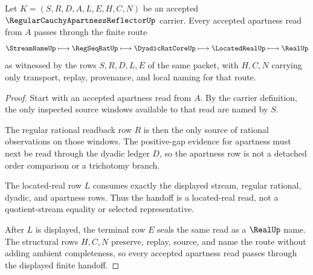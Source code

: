 \begin{theorem}
\label{thm:regular-cauchy-apartness-reflector-located-real-handoff}
Let $K=(S,R,D,A,L,E,H,C,N)$ be an accepted $\RegularCauchyApartnessReflectorUp$ carrier. Every accepted apartness read from $A$ passes through the finite route
$$
\StreamNameUp\longmapsto\RegSeqRatUp\longmapsto\DyadicRatCoreUp\longmapsto\LocatedRealUp\longmapsto\RealUp
$$
as witnessed by the rows $S,R,D,L,E$ of the same packet, with $H,C,N$ carrying only transport, replay, provenance, and local naming for that route.
\end{theorem}
\begin{proof}
Start with an accepted apartness read from $A$. By the carrier definition, the only inspected source windows available to that read are named by $S$.

The regular rational readback row $R$ is then the only source of rational observations on those windows. The positive-gap evidence for apartness must next be read through the dyadic ledger $D$, so the apartness row is not a detached order comparison or a trichotomy branch.

The located-real row $L$ consumes exactly the displayed stream, regular rational, dyadic, and apartness rows. Thus the handoff is a located-real read, not a quotient-stream equality or selected representative.

After $L$ is displayed, the terminal row $E$ seals the same read as a $\RealUp$ name. The structural rows $H,C,N$ preserve, replay, source, and name the route without adding ambient completeness, so every accepted apartness read passes through the displayed finite handoff.
\end{proof}

\begin{closurestatus}{\RegularCauchyApartnessReflectorUp}
  \theoryclosure{\seedClosure}
  \formalstatus{\unformalizedV}
\end{closurestatus}
